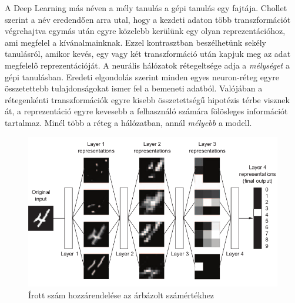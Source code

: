 A Deep Learning más néven a mély tanulás a gépi tanulás egy fajtája. Chollet szerint a név eredendően arra utal, hogy a kezdeti adaton több transzformációt végrehajtva egymás után egyre közelebb kerülünk egy olyan reprezentációhoz, ami megfelel a kívánalmainknak. Ezzel kontrasztban beszélhetünk sekély tanulásról, amikor kevés, egy vagy két transzformáció után kapjuk meg az adat megfelelő reprezentációját.%
A neurális hálózatok rétegeltsége adja a \emph{mélységet} a gépi tanulásban. Eredeti elgondolás szerint minden egyes neuron-réteg egyre összetettebb tulajdonságokat ismer fel a bemeneti adatból. Valójában a rétegenkénti transzformációk egyre kisebb összetettségű hipotézis térbe visznek át, a reprezentáció egyre kevesebb a felhasználó számára fölösleges információt tartalmaz. Minél több a réteg a hálózatban, annál \emph{mélyebb} a modell.
\begin{figure}
	\centering
	\includegraphics[width=0.8\columnwidth]{fig/digit_classification.png}
	\caption{Írott szám hozzárendelése az árbázolt számértékhez}
	\label{fig:digit_classification}
	\footnotemark
\end{figure}

